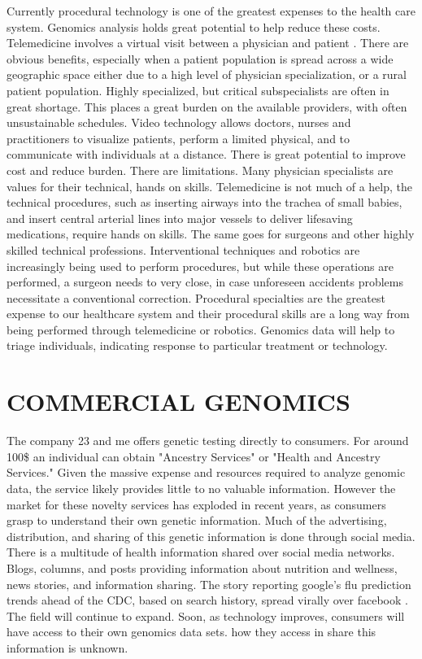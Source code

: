 \documentclass[sigconf]{acmart}
\begin{document}
Currently procedural technology is one of the greatest expenses to the health care system.  Genomics analysis holds great potential to help reduce these costs. Telemedicine involves a virtual visit between a physician and patient
\cite{hernandez2016pediatric}.  There are obvious benefits, especially when a patient population
is spread across a wide geographic space either due to a high level of
physician specialization, or a rural patient population. Highly
specialized, but critical subspecialists are often in great shortage.
This places a great burden on the available providers, with often
unsustainable schedules.  Video technology allows doctors, nurses and
practitioners to visualize patients, perform a limited physical, and
to communicate with individuals at a distance.  There is great
potential to improve cost and reduce burden. There are limitations.
Many physician specialists are values for their technical, hands on
skills.  Telemedicine is not much of a help, the technical procedures,
such as inserting airways into the trachea of small babies, and insert
central arterial lines into major vessels to deliver lifesaving
medications, require hands on skills.  The same goes for surgeons and
other highly skilled technical professions.  Interventional techniques
and robotics are increasingly being used to perform procedures, but
while these operations are performed, a surgeon needs to very close,
in case unforeseen accidents problems necessitate a conventional
correction. Procedural specialties are the greatest expense to our
healthcare system and their procedural skills are a long way from
being performed through telemedicine or robotics.  Genomics data will help to triage individuals, indicating response to particular treatment or technology.
 
\section{COMMERCIAL GENOMICS}

The company 23 and me offers genetic testing directly to consumers.  For around 100\$ an individual can obtain "Ancestry Services" or "Health and Ancestry Services."  Given the massive expense and resources required to analyze genomic data, the service likely provides little to no valuable information.  However the market for these novelty services has exploded in recent years, as consumers grasp to understand their own genetic information.  Much of the advertising, distribution, and sharing of this genetic information is done through social media.  There is a multitude of health information shared
over social media networks.  Blogs, columns, and posts providing
information about nutrition and wellness, news stories, and
information sharing.  The story reporting google’s flu prediction
trends ahead of the CDC, based on search history, spread virally over
facebook \cite{ginsberg2009detecting}.   The field will continue to expand.  Soon, as technology improves, consumers will have access to their own genomics data sets.  how they access in share this information is unknown.    
\end{document}
